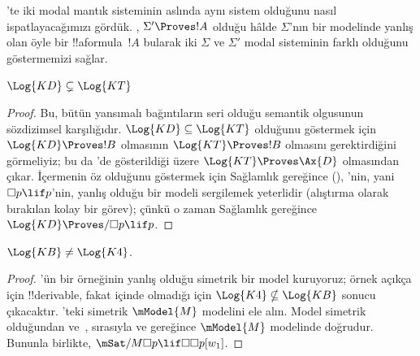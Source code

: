



'te iki modal mantık sisteminin aslında aynı sistem
olduğunu nasıl ispatlayacağımızı gördük. ,
$\Sigma' \Proves !A$ olduğu hâlde $\Sigma$'nın bir modelinde yanlış olan
öyle bir !!a{formula}~$!A$ bularak iki $\Sigma$ ve $\Sigma'$ modal
sisteminin farklı olduğunu göstermemizi sağlar.

\begin{prop}
  $\Log{KD} \subsetneq \Log{KT}$
\end{prop}

\begin{proof} Bu, bütün yansımalı bağıntıların seri olduğu semantik
  olgusunun sözdizimsel karşılığıdır. $\Log{KD} \subseteq \Log{KT}$
  olduğunu göstermek için $\Log{KD} \Proves !B$ olmasının
  $\Log{KT} \Proves !B$ olmasını gerektirdiğini görmeliyiz; bu da
  'de gösterildiği
  üzere $\Log{KT} \Proves \Ax{D}$ olmasından çıkar. İçermenin öz olduğunu
  göstermek için Sağlamlık gereğince (),
  'nin, yani $\Box p \lif p$'nin, yanlış olduğu bir  modeli
  sergilemek yeterlidir (alıştırma olarak bırakılan kolay bir görev);
  çünkü o zaman Sağlamlık gereğince $\Log{KD} \Proves/ \Box p \lif p$.
\end{proof}

\begin{prop}
  $\Log{KB} \neq \Log{K4}$. 
\end{prop}

\begin{proof}
  'ün bir örneğinin yanlış olduğu simetrik bir model kuruyoruz;
  örnek açıkça  için !!{derivable}, fakat  içinde
  olmadığı için $\Log{K4} \nsubseteq \Log{KB}$ sonucu çıkacaktır.
  'teki simetrik $\mModel{M}$ modelini ele alın. Model
  simetrik olduğundan  ve~, sırasıyla 
  ve  gereğince $\mModel{M}$ modelinde
  doğrudur. Bununla birlikte,
  $\mSat/{M}{\Box p \lif \Box\Box p}[w_1]$.
\end{proof}

